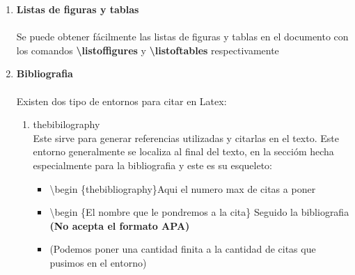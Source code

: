 \documentclass[spanish,12pt,a4paper]{book}%
\begin{document}
\begin{enumerate}
\begin{itemize}
		\item \textbackslash begin \{table\}
		\item centering (para centrar el texto de la tabla)
		\item \textbackslash begin \{tabular\} \{Izquierda Centro Derecha\} Se puede agregar $ |c|$ para rectas verticales
		\item Si queremos ponerle una linea en toda la tabla de manera horizontal usamos \textbf{\textbackslash hline}
		\item \textbackslash end \{tabular\}
		\item \textbackslash end \{table\}
	\end{itemize}
	Usalmente las tablas no siempre generan el mejor tamñao por lo que usaremos algunos paquetes para ello\\
	El paquete graphicx incluye el comando \textbf{\textbackslash 'resizebox'} , el cual nos sirve en el entorno \textbf{'table'} y asigna un tamaño especifico
	\\
\newpage
\item \textbf{Listas de figuras y tablas}\\\\
	Se puede obtener fácilmente las listas de figuras y tablas en el documento con los comandos \textbf{\textbackslash listoffigures} y \textbf{\textbackslash listoftables} respectivamente\\
\item \textbf{Bibliografia}\\\\
 	Existen dos tipo de entornos para citar en Latex:\\
	\begin{enumerate}
 		\item thebibilography\\
 		Este sirve para generar referencias utilizadas  y citarlas en el texto. Este entorno generalmente se localiza al final del texto, en la seccióm hecha especialmente para la bibliografia y este es su esqueleto:\\
 		\begin{itemize}
 			\item \textbackslash begin \{thebibliography\}{Aqui el numero max de citas a poner}
 			\item \textbackslash begin \{El nombre que le pondremos a la cita\} Seguido la bibliografia \textbf{(No acepta el formato APA)}
 			\item (Podemos poner una cantidad finita a la cantidad de citas que pusimos en el entorno)

\end{itemize}
\end{enumerate}
\end{enumerate}
\end{document}
